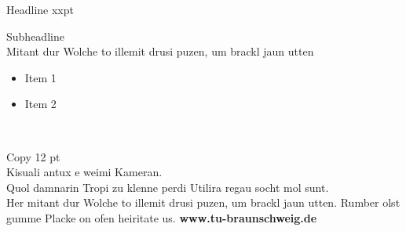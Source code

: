 \documentclass[a3paper,13pt,landscape]{tubsposter}
\begin{document}
\begin{tubsposter}[sender=top]
  \showtubslogo[right]
  \begin{posterrow}[bgcolor=tuRed100]{2}
    \color{tuWhite}
    { Headline xxpt\bigskip}
      
    { Subheadline\\
    Mitant dur Wolche to illemit drusi puzen, um brackl jaun utten}
    \vfill
    \large
    \begin{itemize}
      \item Item 1
      \item Item 2
    \end{itemize}
  \end{posterrow}
  \begin{posterrow}[bgcolor=tuGray20]{1}
    ~
  \end{posterrow}
  \begin{posterrow}[bgcolor=tuRed40]{3}
    Copy 12 pt\\
    Kisuali antux e weimi Kameran.\\
    Quol damnarin Tropi zu klenne perdi Utilira regau socht mol sunt.\\
    Her mitant dur Wolche to illemit drusi puzen, um brackl jaun utten. Rumber olst gumme Placke on ofen heiritate us.
    \vfill
    \textbf{www.tu-braunschweig.de}
  \end{posterrow}
\end{tubsposter}
\end{document}

